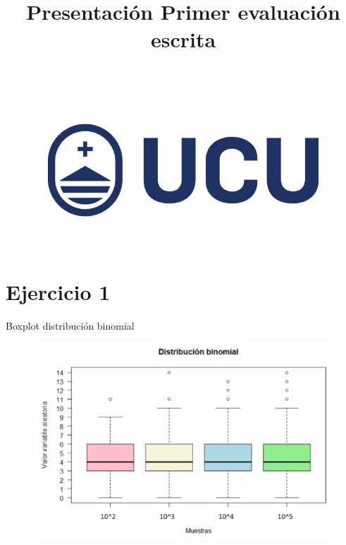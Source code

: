 \documentclass{beamer}
\title{Presentación Primer evaluación escrita}
\date{}
\begin{document}
\begin{frame}
    \titlepage
    \begin{figure}[htpb]
        \begin{center}
            \includegraphics[width=0.5\linewidth]{pic/ucu.png}
        \end{center}
    \end{figure}

\end{frame}

\begin{frame}
    \tableofcontents[sectionstyle=show,subsectionstyle=show/shaded/hide,subsubsectionstyle=show/shaded/hide]
\end{frame}


\section{Ejercicio 1}

\begin{frame}{Boxplot distribución binomial}
\begin{figure}[htpb]
        \begin{center}
            \includegraphics[width=0.8\linewidth]{pic/ej1_box.jpeg}
        \end{center}
    \end{figure}
    
\end{frame}
\end{document}

